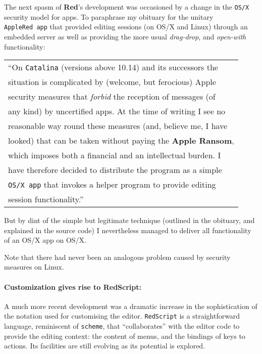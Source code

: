 \documentclass[11pt,a4paper]{article}
\begin{document}
The next spasm of \textbf{Red}'s development was occasioned by a change
in the \texttt{OS/X} security model for apps. To paraphrase my obituary
for the unitary \texttt{AppleRed\ app} that provided editing sessions
(on OS/X and Linux) through an embedded server as well as providing the
more usual \emph{drag-drop}, and \emph{open-with} functionality:

\begin{longtable}[]{@{}l@{}}
\toprule
\endhead
``On \texttt{Catalina} (versions above 10.14) and its successors
the\tabularnewline
situation is complicated by (welcome, but ferocious)
Apple\tabularnewline
security measures that \emph{forbid} the reception of messages
(of\tabularnewline
any kind) by uncertified apps. At the time of writing I see
no\tabularnewline
reasonable way round these measures (and, believe me, I
have\tabularnewline
looked) that can be taken without paying the \textbf{Apple
Ransom},\tabularnewline
which imposes both a financial and an intellectual burden.
I\tabularnewline
have therefore decided to distribute the program as a
simple\tabularnewline
\texttt{OS/X\ app} that invokes a helper program to provide
editing\tabularnewline
session functionality.''\tabularnewline
\bottomrule
\end{longtable}

But by dint of the simple but legitimate technique (outlined in the
obituary, and explained in the source code) I nevertheless managed to
deliver all functionality of an OS/X app on OS/X.

Note that there had never been an analogous problem caused by security
measures on Linux.

\hypertarget{customization-gives-rise-to-redscript}{%
\paragraph{Customization gives rise to
RedScript:}\label{customization-gives-rise-to-redscript}}

A much more recent development was a dramatic increase in the
sophistication of the notation used for customising the editor.
\texttt{RedScript} is a straightforward language, reminiscent of
\texttt{scheme}, that ``collaborates'' with the editor code to provide
the editing context: the content of menus, and the bindings of keys to
actions. Its facilities are still evolving as its potential is explored.
\end{document}
